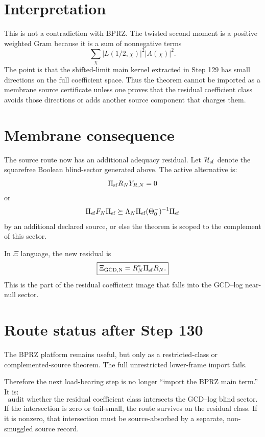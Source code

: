 \documentclass[11pt]{article}
\begin{document}
\section{Interpretation}
This is not a contradiction with BPRZ.  The twisted second moment is a positive weighted Gram because it is a sum of nonnegative terms
\[
  \sum_\chi |L(1/2,\chi)|^2 |A(\chi)|^2.
\]
The point is that the shifted-limit main kernel extracted in Step 129 has small directions on the full coefficient space.  Thus the theorem cannot be imported as a membrane source certificate unless one proves that the residual coefficient class avoids those directions or adds another source component that charges them.

\section{Membrane consequence}
The source route now has an additional adequacy residual.  Let $\mathcal H_{\rm sf}$ denote the squarefree Boolean blind-sector generated above.  The active alternative is:
\[
  \Pi_{\rm sf}R_NY_{R,N}=0
\]
or
\[
  \Pi_{\rm sf}F_N\Pi_{\rm sf}\succeq \Lambda_N\Pi_{\rm sf}(\Theta_0^-)^{-1}\Pi_{\rm sf}
\]
by an additional declared source, or else the theorem is scoped to the complement of this sector.

In $\Xi$ language, the new residual is
\[
  \boxed{
  \Xi_{\rm GCD,N}=R_N^*\Pi_{\rm sf}R_N.
  }
\]
This is the part of the residual coefficient image that falls into the GCD--log near-null sector.

\section{Route status after Step 130}
The BPRZ platform remains useful, but only as a restricted-class or complemented-source theorem.  The full unrestricted lower-frame import fails.

Therefore the next load-bearing step is no longer ``import the BPRZ main term.''  It is:
\[
  \boxed{
  \text{audit whether the residual coefficient class intersects the GCD--log blind sector.}
  }
\]
If the intersection is zero or tail-small, the route survives on the residual class.  If it is nonzero, that intersection must be source-absorbed by a separate, non-smuggled source record.
\end{document}
